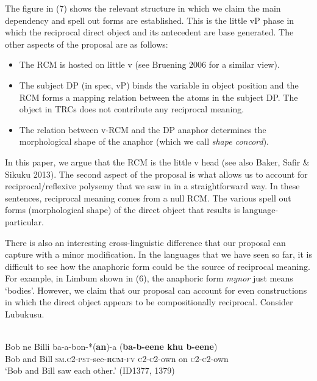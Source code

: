 \documentclass[output=paper]{langsci/langscibook}
\begin{document}
 


 



The figure in (7) shows the relevant structure in which we claim the main dependency and spell out forms are established. This is the little vP phase in which the reciprocal direct object and its antecedent are base generated. The other aspects of the proposal are as follows:


\begin{itemize}
\item The RCM is hosted on little v (see Bruening 2006 for a similar view).

\item The subject DP (in spec, vP) binds the variable in object position and the RCM forms a mapping relation between the atoms in the subject DP. The object in TRCs does not contribute any reciprocal meaning.

\item The relation between v-RCM and the DP anaphor determines the morphological shape of the anaphor (which we call \textit{shape concord}).

\end{itemize}

In this paper, we argue that the RCM is the little v head (see also Baker, Safir \& Sikuku 2013). The second aspect of the proposal is what allows us to account for reciprocal/reflexive polysemy that we saw in  in a straightforward way. In these sentences, reciprocal meaning comes from a null RCM. The various spell out forms (morphological shape) of the direct object that results is language-particular. 

  There is also an interesting cross-linguistic difference that our proposal can capture with a minor modification. In the languages that we have seen so far, it is difficult to see how the anaphoric form could be the source of reciprocal meaning. For example, in Limbum shown in (6), the anaphoric form \textit{mynor} just means ‘bodies’. However, we claim that our proposal can account for even constructions in which the direct object appears to be compositionally reciprocal. Consider Lubukusu.



\ea\label{ex:}
\\
\gll Bob  ne  Billi  ba-a-bon-*(\textbf{an})-a     (\textbf{ba-b-eene  khu b-eene}) \\
Bob   and   Bill   \textsc{sm.c2-pst}-see-\textbf{\textsc{rcm}}\textsc{-fv}   \textsc{c2-c2}-own on \textsc{c2-c2}-own \\
\glt ‘Bob and Bill saw each other.’  (ID1377, 1379) 
\z
\end{document}

